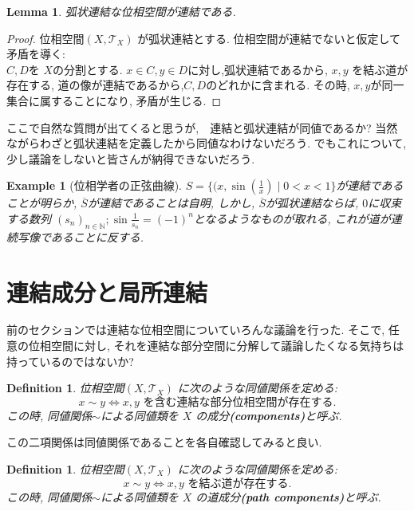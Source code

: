 \documentclass[dvipdfmx]{jbook}
\newcommand{\cl}[1]{\overline{ #1}  }
\newtheorem{lemma}[theorem]{Lemma}
\newtheorem{definition}[theorem]{Definition}
\theoremstyle{remark}
\theoremstyle{plain}
\newtheorem{example}[theorem]{Example}
\begin{document}
\begin{lemma}
	弧状連結な位相空間が連結である.
\end{lemma}

\begin{proof}
	位相空間$\left( X, \mathcal{T}_X \right) $ が弧状連結とする. 
	位相空間が連結でないと仮定して矛盾を導く:　\\
	$C,D$を $X$の分割とする.  
	$x \in C, y \in D$に対し,弧状連結であるから, $x,y$ を結ぶ道が存在する, 
	道の像が連結であるから,$C,D$のどれかに含まれる.
	その時, $x,y$が同一集合に属することになり, 矛盾が生じる.
\end{proof}

ここで自然な質問が出てくると思うが,　連結と弧状連結が同値であるか? 当然ながらわざと弧状連結を定義したから同値なわけないだろう.
でもこれについて, 少し議論をしないと皆さんが納得できないだろう. 

\begin{example}[位相学者の正弦曲線]
	$S=\{(x,\sin (\frac{1}{x})  \mid 0<x< 1\} $が連結であることが明らか,
	$\cl{S}$が連結であることは自明, しかし,  $\cl{S}$が弧状連結ならば,  $0$に収束する数列 $\left( s_n \right) _{n \in \mathbb{N}}; \sin \frac{1}{s_{n}}= (-1)^n$となるようなものが取れる, これが道が連続写像であることに反する.
\end{example}

\section{連結成分と局所連結}

前のセクションでは連結な位相空間についていろんな議論を行った. 
そこで, 任意の位相空間に対し, それを連結な部分空間に分解して議論したくなる気持ちは持っているのではないか?

\begin{definition}
	位相空間$\left( X , \mathcal{T}_{X} \right)$ に次のような同値関係を定める:\\
	$$x \sim y \iff \text{$x,y$ を含む連結な部分位相空間が存在する.}$$
	この時, 同値関係$\sim$による同値類を $X$ の成分\textbf{(components)}と呼ぶ.
\end{definition}

この二項関係は同値関係であることを各自確認してみると良い.

\begin{definition}
	位相空間$\left( X , \mathcal{T}_{X} \right)$ に次のような同値関係を定める:\\
	$$x \sim y \iff \text{$x,y$ を結ぶ道が存在する.}$$
	この時, 同値関係$\sim$による同値類を $X$ の道成分\textbf{(path components)}と呼ぶ.
\end{definition}
\end{document}

